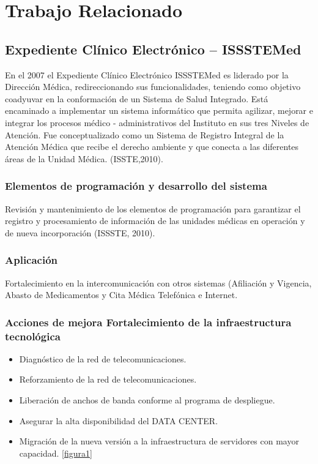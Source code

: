 \chapter{Trabajo Relacionado}

\section{Expediente Clínico Electrónico – ISSSTEMed}

En el 2007 el Expediente Clínico Electrónico ISSSTEMed es liderado por la Dirección Médica, redireccionando sus funcionalidades, teniendo como objetivo coadyuvar en la conformación de un Sistema de Salud Integrado. Está encaminado a implementar un sistema informático que permita agilizar, mejorar e integrar los procesos médico - administrativos del Instituto en sus tres Niveles de Atención. Fue conceptualizado como un Sistema de Registro Integral de la Atención Médica que recibe el derecho ambiente y que conecta a las diferentes áreas de la Unidad Médica. (ISSTE,2010).

\subsection{Elementos de programación y desarrollo del sistema}
 Revisión y mantenimiento de los elementos de programación para garantizar el registro y procesamiento de información de las unidades médicas en operación y de nueva incorporación (ISSSTE, 2010).

\subsection{Aplicación}
 Fortalecimiento en la intercomunicación con otros sistemas (Afiliación y Vigencia, Abasto de Medicamentos y Cita Médica Telefónica e Internet.

\subsection{Acciones de mejora Fortalecimiento de la infraestructura tecnológica }
\begin{itemize}
  \item Diagnóstico de la red de telecomunicaciones.
  \item Reforzamiento de la red de telecomunicaciones.
  \item Liberación de anchos de banda conforme al programa de despliegue.
  \item Asegurar la alta disponibilidad del DATA CENTER.
  \item Migración de la nueva versión a la infraestructura de servidores con mayor capacidad. \ref{figura1}


\end{itemize}

